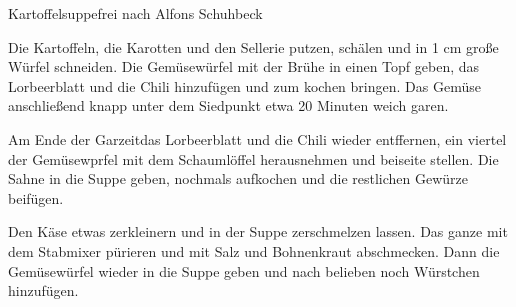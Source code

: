 \begin{recipe}{Kartoffelsuppe}{frei nach Alfons Schuhbeck}
  \inglist
  
  \steps
  Die Kartoffeln, die Karotten und den Sellerie putzen, schälen und in 1 cm große Würfel
  schneiden. Die Gemüsewürfel mit der Brühe in einen Topf geben, das Lorbeerblatt und die
  Chili hinzufügen und zum kochen bringen. Das Gemüse anschließend knapp unter dem
  Siedpunkt etwa 20 Minuten weich garen.

  Am Ende der Garzeitdas Lorbeerblatt und die Chili wieder entffernen, ein viertel der
  Gemüsewprfel mit dem Schaumlöffel herausnehmen und beiseite stellen. Die Sahne in die
  Suppe geben, nochmals aufkochen und die restlichen Gewürze beifügen.

  Den Käse etwas zerkleinern und in der Suppe zerschmelzen lassen. Das ganze mit dem
  Stabmixer pürieren und mit Salz und Bohnenkraut abschmecken. Dann die Gemüsewürfel
  wieder in die Suppe geben und nach belieben noch Würstchen hinzufügen.
\end{recipe}


